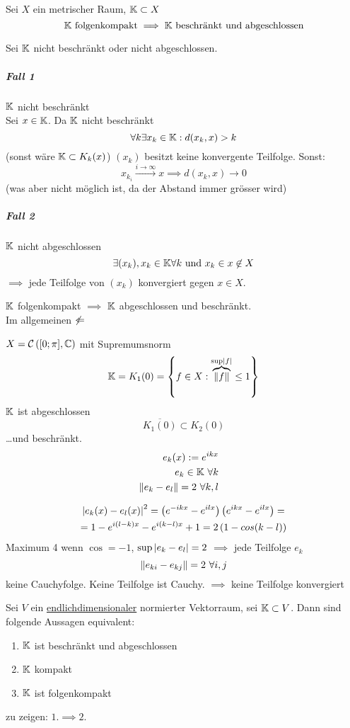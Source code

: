 \begin{Lem}
  Sei $X$ ein metrischer Raum, $\mathbb{K}\subset X$
  \[\mathbb{K}\ \text{folgenkompakt} \implies\text{$\mathbb{K}$ beschränkt und abgeschlossen}\]
\end{Lem}
\begin{Bew}
  Sei $\mathbb{K}$ nicht beschränkt oder nicht abgeschlossen.
  \subparagraph{Fall 1}$\mathbb{K}$ nicht beschränkt\\
  Sei $x\in \mathbb{K}$. Da $\mathbb{K}$ nicht beschränkt
  \[\forall k\exists x_k\in \mathbb{K}:d(x_k,x)>k\]
  (sonst wäre $\mathbb{K}\subset K_k(x)$)
  $(x_k)$ besitzt keine konvergente Teilfolge. Sonst:
  \[x_{k_i}\xrightarrow{i\to\infty}x\implies d(x_k,x)\to 0\]
  (was aber nicht möglich ist, da der Abstand immer grösser wird)
  \subparagraph{Fall 2}$\mathbb{K}$ nicht abgeschlossen
  \[\exists (x_k),x_k\in \mb{K}\forall k\ \text{und}\ x_k\in x\not\in X\]
  $\implies$ jede Teilfolge von $(x_k)$ konvergiert gegen $x\in X$.
\end{Bew}
\begin{Bem}
  $\mathbb{K}$ folgenkompakt $\implies$ $\mathbb{K}$ abgeschlossen und beschränkt.\\
  Im allgemeinen $\not\Leftarrow$
\end{Bem}
\begin{Bsp}
  $X=\mathcal{C}\left( [0;\pi],\mathbb{C} \right)$ mit Supremumsnorm
  \[\mathbb{K}=K_1(0)=\left\{ f\in X:\overbrace{\left\| f \right\|}^{\sup\left| f \right|}\leq 1 \right\}\]
  $\mathbb{K}$ ist abgeschlossen
  \[\overline{K_1(0)}\subset K_2(0)\]
  \ldots und beschränkt.
  \begin{align*}
    e_k(x):=e^{ikx}&&\\
    e_k\in \mathbb{K}\ \forall k&&\\
    \left\| e_k-e_l \right\|=2\ \forall k,l
  \end{align*}
  \begin{Bew}
    \begin{gather*}
      \left| e_k(x)-e_l(x) \right|^2=\left( e^{-ikx}-e^{ilx} \right)\left( e^{ikx}-e^{ilx} \right)=\\
      =1-e^{i(l-k)x}-e^{i(k-l)x}+1 = 2\left( 1-cos(k-l) \right)
    \end{gather*}
    Maximum 4 wenn $\cos = -1$, $\sup\left| e_k-e_l \right|=2$ $\implies$ jede Teilfolge $e_k$
    \[\left\| e_{ki}-e_{kj} \right\|=2\ \forall i,j\]
    keine Cauchyfolge. Keine Teilfolge ist Cauchy. $\implies$ keine Teilfolge konvergiert
  \end{Bew}
\end{Bsp}
\begin{Sat}
  Sei $V$ ein \underline{endlichdimensionaler} normierter Vektorraum, sei $\mathbb{K}\subset V$. Dann sind folgende Aussagen equivalent:
  \begin{enumerate}
    \item $\mathbb{K}$ ist beschränkt und abgeschlossen
    \item $\mathbb{K}$ kompakt
    \item $\mathbb{K}$ ist folgenkompakt
  \end{enumerate}
  zu zeigen: $1.\implies 2.$
\end{Sat}

